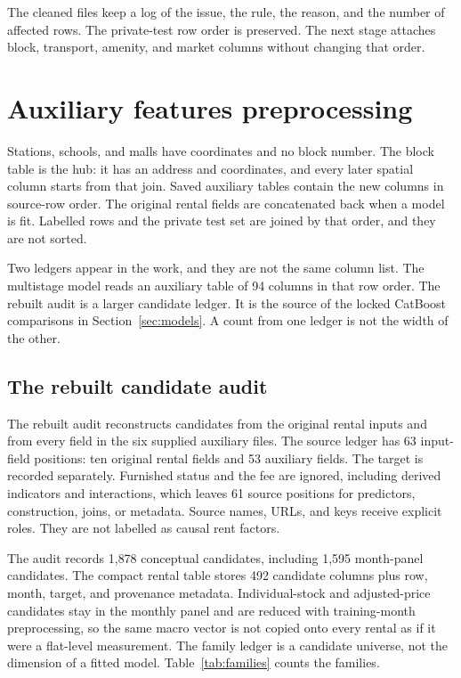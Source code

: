 \documentclass[11pt,a4paper]{article}
\begin{document}
The cleaned files keep a log of the issue, the rule, the reason, and the number of affected rows.
The private-test row order is preserved.
The next stage attaches block, transport, amenity, and market columns without changing that order.

\FloatBarrier
\section{Auxiliary features preprocessing}
\label{sec:aux}

Stations, schools, and malls have coordinates and no block number.
The block table is the hub: it has an address and coordinates, and every later spatial column starts from that join.
Saved auxiliary tables contain the new columns in source-row order.
The original rental fields are concatenated back when a model is fit.
Labelled rows and the private test set are joined by that order, and they are not sorted.

Two ledgers appear in the work, and they are not the same column list.
The multistage model reads an auxiliary table of 94 columns in that row order.
The rebuilt audit is a larger candidate ledger.
It is the source of the locked CatBoost comparisons in Section~\ref{sec:models}.
A count from one ledger is not the width of the other.

\subsection{The rebuilt candidate audit}
\label{sec:rebuild}

The rebuilt audit reconstructs candidates from the original rental inputs and from every field in the six supplied auxiliary files.
The source ledger has 63 input-field positions: ten original rental fields and 53 auxiliary fields.
The target is recorded separately.
Furnished status and the fee are ignored, including derived indicators and interactions, which leaves 61 source positions for predictors, construction, joins, or metadata.
Source names, URLs, and keys receive explicit roles.
They are not labelled as causal rent factors.

The audit records 1{,}878 conceptual candidates, including 1{,}595 month-panel candidates.
The compact rental table stores 492 candidate columns plus row, month, target, and provenance metadata.
Individual-stock and adjusted-price candidates stay in the monthly panel and are reduced with training-month preprocessing, so the same macro vector is not copied onto every rental as if it were a flat-level measurement.
The family ledger is a candidate universe, not the dimension of a fitted model.
Table~\ref{tab:families} counts the families.
\end{document}
